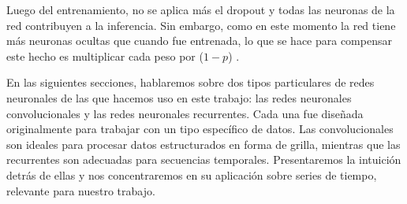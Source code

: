 \documentclass[../../main.tex]{subfiles}
\begin{document}
Luego del entrenamiento, no se aplica más el dropout y todas las neuronas de la red
contribuyen a la inferencia. Sin embargo, como en este momento la red tiene más neuronas
ocultas que cuando fue entrenada, lo que se hace para compensar este hecho es multiplicar
cada peso por (\(1-p\)) \cite{prince2024understanding}.

\bigskip
En las siguientes secciones, hablaremos sobre dos tipos particulares de redes neuronales
de las que hacemos uso en este trabajo: las redes neuronales convolucionales y las redes
neuronales recurrentes. Cada una fue diseñada originalmente para trabajar con un tipo
específico de datos. Las convolucionales son ideales para procesar datos estructurados en
forma de grilla, mientras que las recurrentes son adecuadas para secuencias temporales.
Presentaremos la intuición detrás de ellas y nos concentraremos en su aplicación sobre
series de tiempo, relevante para nuestro trabajo.
\end{document}
